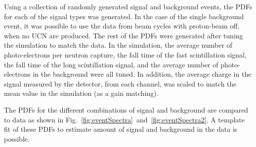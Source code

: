 \documentclass[twocolumn]{bmcart}
\begin{document}
Using a collection of randomly generated signal and background events,
the PDFs for each of the signal types was generated.  In the case of
the single background event, it was possible to use the data from beam
cycles with proton-beam off, when no UCN are produced.  The rest of
the PDFs were generated after tuning the simulation to match the data.
In the simulation, the average number of photo-electrons per neutron
capture, the fall time of the fast scintillation signal, the fall time
of the long scintillation signal, and the average number of
photo-electrons in the background were all tuned.  In addition, the
average charge in the signal measured by the detector, from each
channel, was scaled to match the mean value in the simulation (as a
gain matching).

The PDFs for the different combinations of signal and background are
compared to data as shown in
Fig.~\ref{fig:eventSpectra}~and~\ref{fig:eventSpectra2}.  A template
fit of these PDFs to estimate amount of signal and background in the
data is possible.
\end{document}
